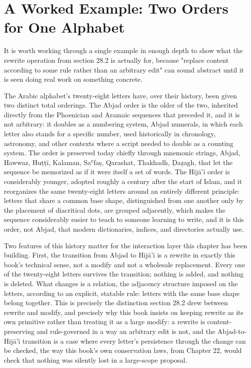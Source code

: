 \section{A Worked Example: Two Orders for One Alphabet}

It is worth working through a single example in enough depth to show what the rewrite operation from section 28.2 is actually for, because "replace content according to some rule rather than an arbitrary edit" can sound abstract until it is seen doing real work on something concrete.

The Arabic alphabet's twenty-eight letters have, over their history, been given two distinct total orderings. The Abjad order is the older of the two, inherited directly from the Phoenician and Aramaic sequences that preceded it, and it is not arbitrary: it doubles as a numbering system, Abjad numerals, in which each letter also stands for a specific number, used historically in chronology, astronomy, and other contexts where a script needed to double as a counting system. The order is preserved today chiefly through mnemonic strings, Abjad, Hawwaz, Huṭṭī, Kalaman, Saʿfaṣ, Qarashat, Thakhadh, Ḍaẓagh, that let the sequence be memorized as if it were itself a set of words. The Hijā'ī order is considerably younger, adopted roughly a century after the start of Islam, and it reorganizes the same twenty-eight letters around an entirely different principle: letters that share a common base shape, distinguished from one another only by the placement of diacritical dots, are grouped adjacently, which makes the sequence considerably easier to teach to someone learning to write, and it is this order, not Abjad, that modern dictionaries, indices, and directories actually use.

Two features of this history matter for the interaction layer this chapter has been building. First, the transition from Abjad to Hijā'ī is a rewrite in exactly this book's technical sense, not a modify and not a wholesale replacement. Every one of the twenty-eight letters survives the transition; nothing is added, and nothing is deleted. What changes is a relation, the adjacency structure imposed on the letters, according to an explicit, statable rule: letters with the same base shape belong together. This is precisely the distinction section 28.2 drew between rewrite and modify, and precisely why this book insists on keeping rewrite as its own primitive rather than treating it as a large modify: a rewrite is content-preserving and rule-governed in a way an arbitrary edit is not, and the Abjad-to-Hijā'ī transition is a case where every letter's persistence through the change can be checked, the way this book's own conservation laws, from Chapter 22, would check that nothing was silently lost in a large-scope proposal.

